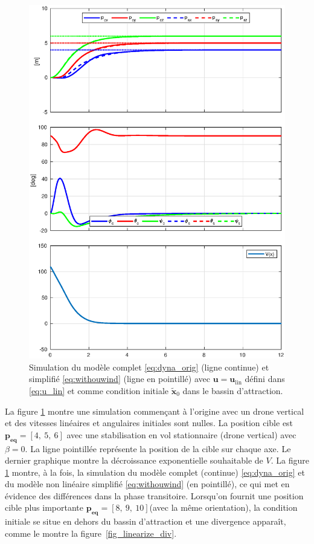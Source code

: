 \begin{figure}[ht!]
    \centering
    \includegraphics[trim=0cm 0.6cm 0cm 1cm,clip,width=0.8\columnwidth]{figures/converge2.eps}
    \caption{Simulation du modèle complet \eqref{eq:dyna_orig} (ligne continue) et simplifié \eqref{eq:withouwind} (ligne en pointillé) avec $\boldsymbol{u} = \boldsymbol{u}_{\text{lin}}$ défini dans 
    \eqref{eq:u_lin} et comme condition initiale $\tilde{ \boldsymbol{x}}_0$ dans le bassin d'attraction.}
    \label{fig_linearize_conv}
\end{figure}

La figure \ref{fig_linearize_conv} montre une simulation commençant à l'origine avec un drone vertical et des vitesses linéaires et angulaires initiales sont nulles. La position cible est $\boldsymbol{p_{\text{eq}}} = [4,~5,~6]$ avec une stabilisation en vol stationnaire (drone vertical) avec $\beta = 0$. La ligne pointillée représente la position de la cible sur chaque axe. Le dernier graphique montre la décroissance exponentielle souhaitable de $V$.
La figure \ref{fig_linearize_conv} montre, à la fois, la simulation du modèle complet (continue) \eqref{eq:dyna_orig} et du modèle non linéaire simplifié \eqref{eq:withouwind} (en pointillé), ce qui met en évidence des différences dans la phase transitoire.
Lorsqu'on fournit une position cible plus importante $\boldsymbol{p_{\text{eq}}} =[8,~9,~10]$(avec la même orientation), la condition initiale se situe en dehors du bassin d'attraction et une divergence apparaît, comme le montre la figure~\ref{fig_linearize_div}.

